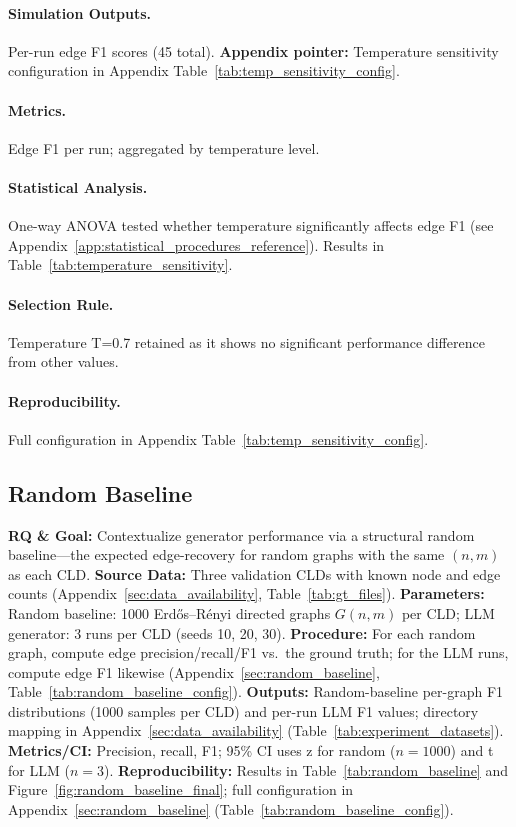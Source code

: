 \paragraph{Simulation Outputs.}
Per-run edge F1 scores (45 total).
\textbf{Appendix pointer:} Temperature sensitivity configuration in Appendix Table~\ref{tab:temp_sensitivity_config}.

\paragraph{Metrics.}
Edge F1 per run; aggregated by temperature level.

\paragraph{Statistical Analysis.}
One-way ANOVA tested whether temperature significantly affects edge F1 (see Appendix~\ref{app:statistical_procedures_reference}). Results in Table~\ref{tab:temperature_sensitivity}.

\paragraph{Selection Rule.}
Temperature T=0.7 retained as it shows no significant performance difference from other values.

\paragraph{Reproducibility.}
Full configuration in Appendix Table~\ref{tab:temp_sensitivity_config}.

\subsection{Random Baseline}
\label{sec:random_baseline_method}

\noindent\textbf{RQ \& Goal:} Contextualize generator performance via a structural random baseline---the expected edge-recovery for random graphs with the same $(n,m)$ as each CLD. \textbf{Source Data:} Three validation CLDs with known node and edge counts (Appendix~\ref{sec:data_availability}, Table~\ref{tab:gt_files}). \textbf{Parameters:} Random baseline: 1000 Erd\H{o}s--R\'enyi directed graphs $G(n,m)$ per CLD; LLM generator: 3 runs per CLD (seeds 10, 20, 30). \textbf{Procedure:} For each random graph, compute edge precision/recall/F1 vs.\ the ground truth; for the LLM runs, compute edge F1 likewise (Appendix~\ref{sec:random_baseline}, Table~\ref{tab:random_baseline_config}). \textbf{Outputs:} Random-baseline per-graph F1 distributions (1000 samples per CLD) and per-run LLM F1 values; directory mapping in Appendix~\ref{sec:data_availability} (Table~\ref{tab:experiment_datasets}). \textbf{Metrics/CI:} Precision, recall, F1; 95\% CI uses z for random ($n{=}1000$) and t for LLM ($n{=}3$). \textbf{Reproducibility:} Results in Table~\ref{tab:random_baseline} and Figure~\ref{fig:random_baseline_final}; full configuration in Appendix~\ref{sec:random_baseline} (Table~\ref{tab:random_baseline_config}).

